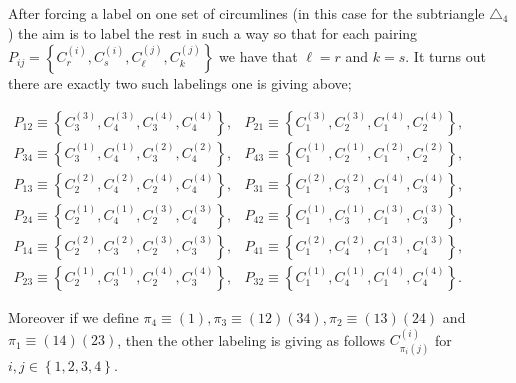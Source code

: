 \documentclass[11pt]{article}
\begin{document}
\bigskip

After forcing a label on one set of circumlines (in this case for the
subtriangle $\triangle _{4}$) the aim is to label the rest in such a way so
that for each pairing $P_{ij}=\left\{ C_{r}^{\left( i\right) },C_{s}^{\left(
i\right) },C_{\ell }^{\left( j\right) },C_{k}^{\left( j\right) }\right\} $
we have that $\ell =r$ and $k=s$. It turns out there are exactly two such
labelings one is giving above;

\bigskip $%
\begin{array}{cc}
P_{12}\equiv \left\{ C_{3}^{\left( 3\right) },C_{4}^{\left( 3\right)
},C_{3}^{\left( 4\right) },C_{4}^{\left( 4\right) }\right\} , & P_{21}\equiv
\left\{ C_{1}^{\left( 3\right) },C_{2}^{\left( 3\right) },C_{1}^{\left(
4\right) },C_{2}^{\left( 4\right) }\right\} , \\ 
P_{34}\equiv \left\{ C_{3}^{\left( 1\right) },C_{4}^{\left( 1\right)
},C_{3}^{\left( 2\right) },C_{4}^{\left( 2\right) }\right\} , & P_{43}\equiv
\left\{ C_{1}^{\left( 1\right) },C_{2}^{\left( 1\right) },C_{1}^{\left(
2\right) },C_{2}^{\left( 2\right) }\right\} , \\ 
P_{13}\equiv \left\{ C_{2}^{\left( 2\right) },C_{4}^{\left( 2\right)
},C_{2}^{\left( 4\right) },C_{4}^{\left( 4\right) }\right\} , & P_{31}\equiv
\left\{ C_{1}^{\left( 2\right) },C_{3}^{\left( 2\right) },C_{1}^{\left(
4\right) },C_{3}^{\left( 4\right) }\right\} , \\ 
P_{24}\equiv \left\{ C_{2}^{\left( 1\right) },C_{4}^{\left( 1\right)
},C_{2}^{\left( 3\right) },C_{4}^{\left( 3\right) }\right\} , & P_{42}\equiv
\left\{ C_{1}^{\left( 1\right) },C_{3}^{\left( 1\right) },C_{1}^{\left(
3\right) },C_{3}^{\left( 3\right) }\right\} , \\ 
P_{14}\equiv \left\{ C_{2}^{\left( 2\right) },C_{3}^{\left( 2\right)
},C_{2}^{\left( 3\right) },C_{3}^{\left( 3\right) }\right\} , & P_{41}\equiv
\left\{ C_{1}^{\left( 2\right) },C_{4}^{\left( 2\right) },C_{1}^{\left(
3\right) },C_{4}^{\left( 3\right) }\right\} , \\ 
P_{23}\equiv \left\{ C_{2}^{\left( 1\right) },C_{3}^{\left( 1\right)
},C_{2}^{\left( 4\right) },C_{3}^{\left( 4\right) }\right\} , & P_{32}\equiv
\left\{ C_{1}^{\left( 1\right) },C_{4}^{\left( 1\right) },C_{1}^{\left(
4\right) },C_{4}^{\left( 4\right) }\right\} .%
\end{array}%
$\newline

Moreover if we define $\pi _{4}\equiv \left( 1\right) ,\pi _{3}\equiv \left(
12\right) \left( 34\right) ,\pi _{2}\equiv \left( 13\right) \left( 24\right) 
$ and $\pi _{1}\equiv \left( 14\right) \left( 23\right) $, then the other
labeling is giving as follows $C_{\pi _{i}\left( j\right) }^{\left( i\right)
}$ for $i,j\in \left\{ 1,2,3,4\right\} $.
\end{document}
